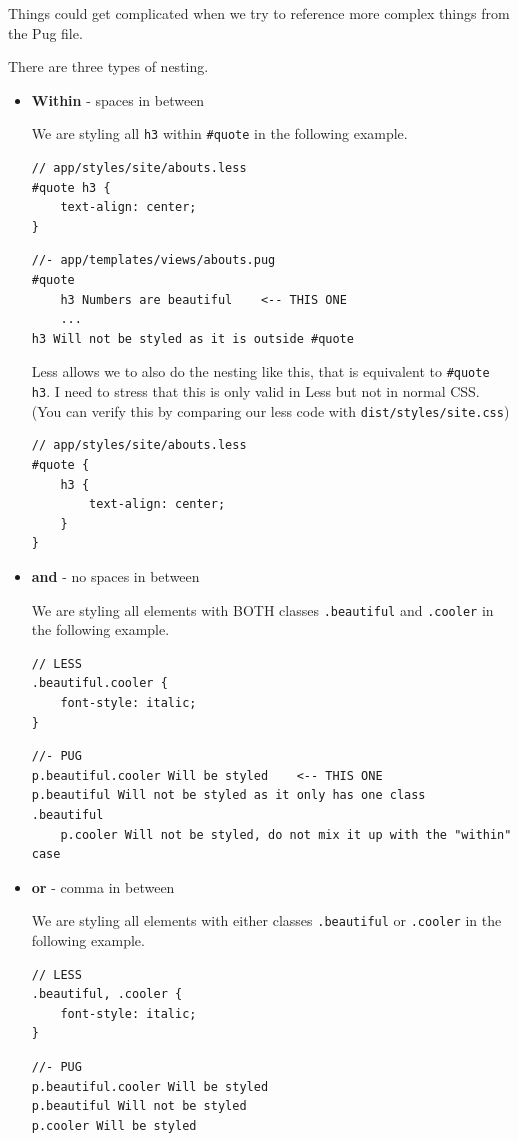 Things could get complicated when we try to reference more complex things from the Pug file.

There are three types of nesting. 

\begin{itemize}
\item \textbf{Within} - spaces in between

We are styling all \texttt{h3} within \texttt{\#quote} in the following example.
    
\begin{lstlisting}[language=pug]
// app/styles/site/abouts.less
#quote h3 {
    text-align: center;
}
\end{lstlisting}
    
\begin{lstlisting}[language=pug]
//- app/templates/views/abouts.pug
#quote 
    h3 Numbers are beautiful    <-- THIS ONE
    ...
h3 Will not be styled as it is outside #quote
\end{lstlisting}

Less allows we to also do the nesting like this, that is equivalent to \texttt{\#quote h3}. I need to stress that this is only valid in Less but not in normal CSS. (You can verify this by comparing our less code with \texttt{dist/styles/site.css})

\begin{lstlisting}[language=pug]
// app/styles/site/abouts.less
#quote {
    h3 {
        text-align: center;
    }
}
\end{lstlisting}

\item \textbf{and} - no spaces in between

We are styling all elements with BOTH classes \texttt{.beautiful} and \texttt{.cooler} in the following example.
    
\begin{lstlisting}[language=pug]
// LESS
.beautiful.cooler {
    font-style: italic;
}
\end{lstlisting}

\begin{lstlisting}[language=pug]
//- PUG
p.beautiful.cooler Will be styled    <-- THIS ONE
p.beautiful Will not be styled as it only has one class
.beautiful
    p.cooler Will not be styled, do not mix it up with the "within" case
\end{lstlisting}

\item \textbf{or} - comma in between

We are styling all elements with either classes \texttt{.beautiful} or \texttt{.cooler} in the following example.
    
\begin{lstlisting}[language=pug]
// LESS
.beautiful, .cooler {
    font-style: italic;
}
\end{lstlisting}

\begin{lstlisting}[language=pug]
//- PUG
p.beautiful.cooler Will be styled 
p.beautiful Will not be styled 
p.cooler Will be styled
\end{lstlisting}

\end{itemize}

